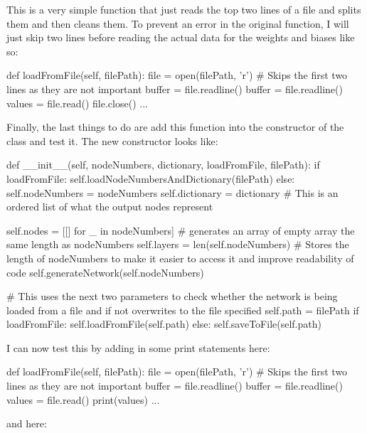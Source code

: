 \documentclass{report}
\begin{document}
This is a very simple function that just reads the top two lines of a file and splits them and then cleans them.
\newline
To prevent an error in the original  function, I will just skip two lines before reading the actual data for the weights and biases like so:
\begin{python}
def loadFromFile(self, filePath):
    file = open(filePath, 'r')
    # Skips the first two lines as they are not important
    buffer = file.readline()
    buffer = file.readline()
    values = file.read()
    file.close()
    ...
\end{python}
Finally, the last things to do are add this function into the constructor of the class and test it. The new constructor looks like:
\begin{python}
def __init__(self, nodeNumbers, dictionary, loadFromFile, filePath):
    if loadFromFile:
        self.loadNodeNumbersAndDictionary(filePath)
    else:
        self.nodeNumbers = nodeNumbers
        self.dictionary = dictionary  # This is an ordered list of what the output nodes represent

    self.nodes = [[] for _ in nodeNumbers]  # generates an array of empty array the same length as nodeNumbers
    self.layers = len(self.nodeNumbers)  # Stores the length of nodeNumbers to make it easier to access it and improve readability of code
    self.generateNetwork(self.nodeNumbers)

    # This uses the next two parameters to check whether the network is being loaded from a file and if not overwrites to the file specified
    self.path = filePath
    if loadFromFile:
        self.loadFromFile(self.path)
    else:
        self.saveToFile(self.path)
\end{python}
I can now test this by adding in some print statements here:
\begin{python}
def loadFromFile(self, filePath):
    file = open(filePath, 'r')
    # Skips the first two lines as they are not important
    buffer = file.readline()
    buffer = file.readline()
    values = file.read()
    print(values)
    ...
\end{python}
and here:
\end{document}
